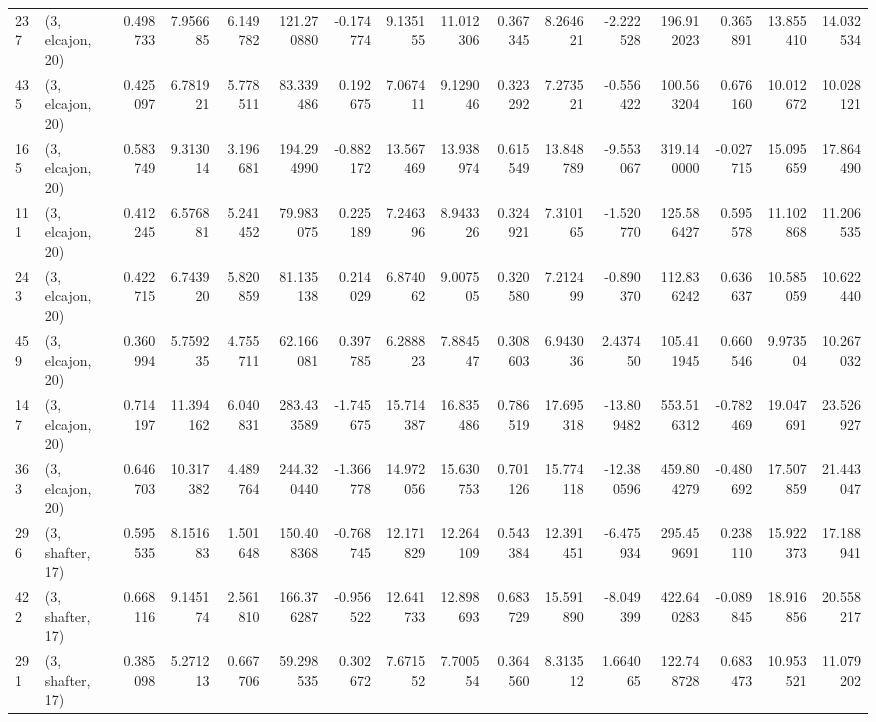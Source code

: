 \begin{tabular}{llrrrrrrrrrrrrrr}
237 &  (3, elcajon, 20) &   0.498733 &   7.956685 &   6.149782 &   121.270880 &  -0.174774 &   9.135155 &  11.012306 &  0.367345 &   8.264621 &  -2.222528 &   196.912023 &   0.365891 &  13.855410 &  14.032534 \\
435 &  (3, elcajon, 20) &   0.425097 &   6.781921 &   5.778511 &    83.339486 &   0.192675 &   7.067411 &   9.129046 &  0.323292 &   7.273521 &  -0.556422 &   100.563204 &   0.676160 &  10.012672 &  10.028121 \\
165 &  (3, elcajon, 20) &   0.583749 &   9.313014 &   3.196681 &   194.294990 &  -0.882172 &  13.567469 &  13.938974 &  0.615549 &  13.848789 &  -9.553067 &   319.140000 &  -0.027715 &  15.095659 &  17.864490 \\
111 &  (3, elcajon, 20) &   0.412245 &   6.576881 &   5.241452 &    79.983075 &   0.225189 &   7.246396 &   8.943326 &  0.324921 &   7.310165 &  -1.520770 &   125.586427 &   0.595578 &  11.102868 &  11.206535 \\
243 &  (3, elcajon, 20) &   0.422715 &   6.743920 &   5.820859 &    81.135138 &   0.214029 &   6.874062 &   9.007505 &  0.320580 &   7.212499 &  -0.890370 &   112.836242 &   0.636637 &  10.585059 &  10.622440 \\
459 &  (3, elcajon, 20) &   0.360994 &   5.759235 &   4.755711 &    62.166081 &   0.397785 &   6.288823 &   7.884547 &  0.308603 &   6.943036 &   2.437450 &   105.411945 &   0.660546 &   9.973504 &  10.267032 \\
147 &  (3, elcajon, 20) &   0.714197 &  11.394162 &   6.040831 &   283.433589 &  -1.745675 &  15.714387 &  16.835486 &  0.786519 &  17.695318 & -13.809482 &   553.516312 &  -0.782469 &  19.047691 &  23.526927 \\
363 &  (3, elcajon, 20) &   0.646703 &  10.317382 &   4.489764 &   244.320440 &  -1.366778 &  14.972056 &  15.630753 &  0.701126 &  15.774118 & -12.380596 &   459.804279 &  -0.480692 &  17.507859 &  21.443047 \\
296 &  (3, shafter, 17) &   0.595535 &   8.151683 &   1.501648 &   150.408368 &  -0.768745 &  12.171829 &  12.264109 &  0.543384 &  12.391451 &  -6.475934 &   295.459691 &   0.238110 &  15.922373 &  17.188941 \\
422 &  (3, shafter, 17) &   0.668116 &   9.145174 &   2.561810 &   166.376287 &  -0.956522 &  12.641733 &  12.898693 &  0.683729 &  15.591890 &  -8.049399 &   422.640283 &  -0.089845 &  18.916856 &  20.558217 \\
291 &  (3, shafter, 17) &   0.385098 &   5.271213 &   0.667706 &    59.298535 &   0.302672 &   7.671552 &   7.700554 &  0.364560 &   8.313512 &   1.664065 &   122.748728 &   0.683473 &  10.953521 &  11.079202 \\

\end{tabular}
